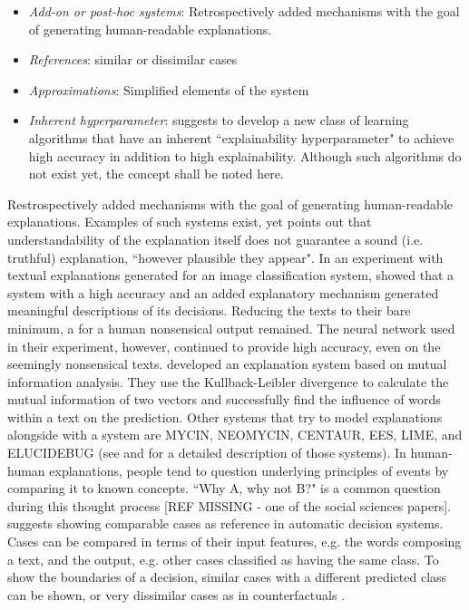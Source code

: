 \begin{itemize}
	\item \textit{Add-on or post-hoc systems}: Retrospectively added mechanisms with the goal of generating human-readable explanations.
	\item \textit{References}: similar or dissimilar cases
	\item \textit{Approximations}: Simplified elements of the system
	\item \textit{Inherent hyperparameter}: \cite{richardson2018survey} suggests to develop a new class of learning algorithms that have an inherent ``explainability hyperparameter" to achieve high accuracy in addition to high explainability. Although such algorithms do not exist yet, the concept shall be noted here.
\end{itemize}
Restrospectively added mechanisms with the goal of generating human-readable explanations. Examples of such systems exist, yet \cite{lipton2016mythos} points out that understandability of the explanation itself does not guarantee a sound (i.e. truthful) explanation, ``however plausible they appear". In an experiment with textual explanations generated for an image classification system, \cite{feng2018pathologies} showed that a system with a high accuracy and an added explanatory mechanism generated meaningful descriptions of its decisions. Reducing the texts to their bare minimum, a for a human nonsensical output remained. The neural network used in their experiment, however, continued to provide high accuracy, even on the seemingly nonsensical texts. \cite{chen2018learning} developed an explanation system based on mutual information analysis. They use the Kullback-Leibler divergence to calculate the mutual information of two vectors and successfully find the influence of words within a text on the prediction. Other systems that try to model explanations alongside with a system are MYCIN, NEOMYCIN, CENTAUR, EES, LIME, and ELUCIDEBUG (see \cite{preece2018asking} and \cite{ribeiro2016should} for a detailed description of those systems).\newline
In human-human explanations, people tend to question underlying principles of events by comparing it to known concepts. ``Why A, why not B?" is a common question during this thought process {\color{red}[REF MISSING - one of the social sciences papers]}. \cite{chen2018learning} suggests showing comparable cases as reference in automatic decision systems. Cases can be compared in terms of their input features, e.g. the words composing a text, and the output, e.g. other cases classified as having the same class. To show the boundaries of a decision, similar cases with a different predicted class can be shown, or very dissimilar cases as in counterfactuals \cite{hendricks2018generating}.\newline

